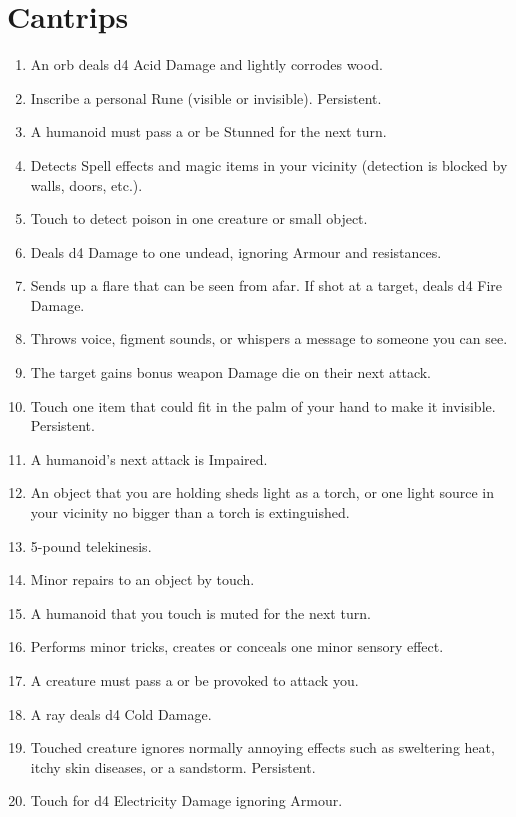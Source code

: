 \documentclass[itdr/core]{subfiles}
\begin{document}
\section{Cantrips}
\def \spellcircle {C}
\begin{enumerate}
	\item {} An orb deals d4 Acid Damage and lightly corrodes wood.
	\item {} Inscribe a personal Rune (visible or invisible). Persistent.
	\item {} A humanoid must pass a  or be Stunned for the next turn.
	\item {} Detects Spell effects and magic items in your vicinity (detection is blocked by walls, doors, etc.).
	\item {} Touch to detect poison in one creature or small object.
	\item {} Deals d4 Damage to one \mbox{undead}, ignoring Armour and resistances.
	\item {} Sends up a flare that can be seen from afar. If shot at a target, deals d4 Fire Damage.
	\item {} Throws voice, figment sounds, or whispers a message to someone you can see.
	\item {} The target gains bonus weapon Damage die on their next attack.
	\item {} Touch one item that could fit in the palm of your hand to make it invisible. Persistent.
	\item {} A humanoid's next attack is Impaired.
	\item {} An object that you are holding sheds light as a torch, or one light source in your vicinity no bigger than a torch is extinguished.
	\item {} 5-pound telekinesis.
	\item {} Minor repairs to an object by touch.
	\item {} A humanoid that you touch is muted for the next turn.
	\item {} Performs minor tricks, creates or conceals one minor sensory effect.
	\item {} A creature must pass a  or be provoked to attack you.
	\item {} A ray deals d4 Cold Damage.
	\item {} Touched creature ignores normally annoying effects such as sweltering heat, itchy skin diseases, or a sandstorm. Persistent.
	\item {} Touch for d4 Electricity Damage ignoring Armour.
\end{enumerate}
\end{document}
